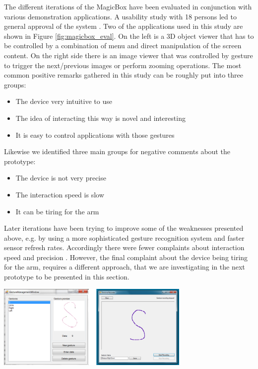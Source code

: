 The different iterations of the MagicBox have been evaluated in conjunction with various demonstration applications. A usability study with 18 persons led to general approval of the system \cite{Braun2011MultiInputDevice}. Two of the applications used in this study are shown in Figure \ref{fig:magicbox_eval}. On the left is a 3D object viewer that has to be controlled by a combination of menu and direct manipulation of the screen content. On the right side there is an image viewer that was controlled by gesture to trigger the next/previous images or perform zooming operations. The most common positive remarks gathered in this study can be roughly put into three groups:
\begin{itemize}
\item{The device very intuitive to use}
\item{The idea of interacting this way is novel and interesting}
\item{It is easy to control applications with those gestures}
\end{itemize}
Likewise we identified three main groups for negative comments about the prototype:
\begin{itemize}
\item{The device is not very precise}
\item{The interaction speed is slow}
\item{It can be tiring for the arm}
\end{itemize}
Later iterations have been trying to improve some of the weaknesses presented above, e.g. by using a more sophisticated gesture recognition system and faster sensor refresh rates. Accordingly there were fewer complaints about interaction speed and precision \cite{braun2013capacitive}. However, the final complaint about the device being tiring for the arm, requires a different approach, that we are investigating in the next prototype to be presented in this section.

\begin{minipage}{\linewidth}
\centering
\includegraphics[width=0.7\textwidth]{images/magicbox_data_gest}
\label{fig:magicbox_data_gest}
\end{minipage}


